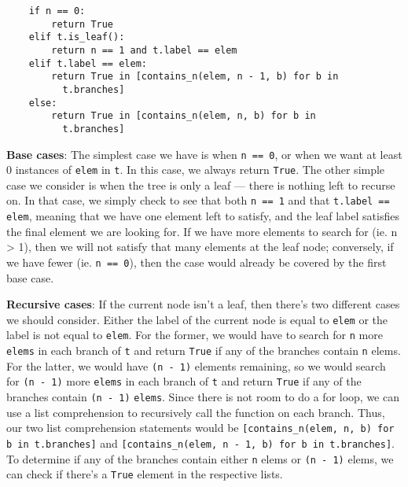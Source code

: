 \begin{blocksection}
\begin{solution}
\begin{lstlisting}
    if n == 0:
        return True
    elif t.is_leaf():
        return n == 1 and t.label == elem
    elif t.label == elem:
        return True in [contains_n(elem, n - 1, b) for b in     
          t.branches]
    else:
        return True in [contains_n(elem, n, b) for b in 
          t.branches]
\end{lstlisting}
\textbf{Base cases}: The simplest case we have is when \lstinline{n == 0}, or when we want at least 0 instances of \lstinline{elem} in \lstinline{t}. In this case, we always return \lstinline{True}. The other simple case we consider is when the tree is only a leaf — there is nothing left to recurse on. In that case, we simply check to see that both \lstinline{n == 1} and that \lstinline{t.label == elem}, meaning that we have one element left to satisfy, and the leaf label satisfies the final element we are looking for. If we have more elements to search for (ie. n > 1), then we will not satisfy that many elements at the leaf node; conversely, if we have fewer (ie. \lstinline{n == 0}), then the case would already be covered by the first base case.

\textbf{Recursive cases}: If the current node isn't a leaf, then there's two different cases we should consider. Either the label of the current node is equal to \lstinline{elem} or the label is not equal to \lstinline{elem}. For the former, we would have to search for \lstinline{n} more \lstinline{elems} in each branch of \lstinline{t} and return \lstinline{True} if any of the branches contain \lstinline{n} elems. For the latter, we would have \lstinline{(n - 1)} elements remaining, so we would search for \lstinline{(n - 1)} more \lstinline{elems} in each branch of \lstinline{t} and return \lstinline{True} if any of the branches contain \lstinline{(n - 1)} \lstinline{elems}. Since there is not room to do a for loop, we can use a list comprehension to recursively call the function on each branch. Thus, our two list comprehension statements would be \lstinline{[contains_n(elem, n, b) for b in t.branches]} and \lstinline{[contains_n(elem, n - 1, b) for b in t.branches]}. To determine if any of the branches contain either \lstinline{n} elems or \lstinline{(n - 1)} elems, we can check if there's a \lstinline{True} element in the respective lists.

\end{solution}


\end{blocksection}
